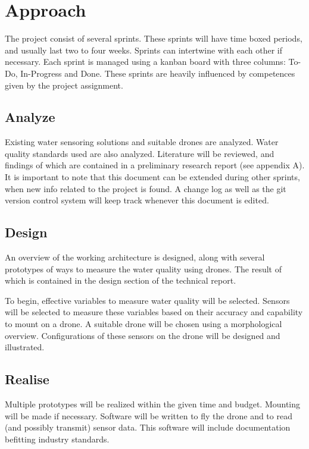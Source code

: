 \newpage
\section{Approach} \label{approach}
The project consist of several sprints. These sprints will have time boxed periods, and usually last two to four weeks. Sprints can intertwine with each other if necessary. Each sprint is managed using a kanban \cite{kanban} board with three columns: To-Do, In-Progress and Done. These sprints are heavily influenced by competences given by the project assignment. \cite{assignmentform}

\subsection{Analyze} \label{sprint:analyze}
Existing water sensoring solutions and suitable drones are analyzed. Water quality standards used are also analyzed. Literature will be reviewed, and findings of which are contained in a preliminary research report (see appendix A). It is important to note that this document can be extended during other sprints, when new info related to the project is found. A change log as well as the git version control system \cite{git} will keep track whenever this document is edited.

\subsection{Design} \label{sprint:design}
An overview of the working architecture is designed, along with several prototypes of ways to measure the water quality using drones. The result of which is contained in the design section of the technical report.

To begin, effective variables to measure water quality will be selected. Sensors will be selected to measure these variables based on their accuracy and capability to mount on a drone. A suitable drone will be chosen using a morphological overview. Configurations of these sensors on the drone will be designed and illustrated. 

\subsection{Realise} \label{sprint:realise}
Multiple prototypes will be realized within the given time and budget. Mounting will be made if necessary. Software will be written to fly the drone and to read (and possibly transmit) sensor data. This software will include documentation befitting industry standards.\\

